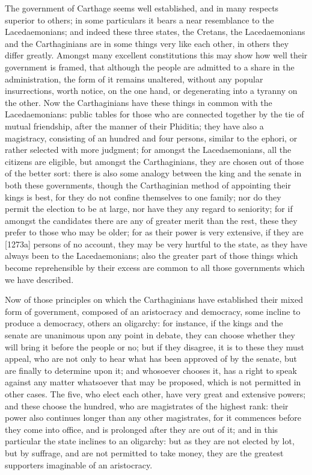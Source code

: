 
The government of Carthage seems well established, and in many respects
superior to others; in some particulars it bears a near resemblance to the
Lacedaemonians; and indeed these three states, the Cretans, the
Lacedaemonians and the Carthaginians are in some things very like each
other, in others they differ greatly. Amongst many excellent constitutions
this may show how well their government is framed, that although the
people are admitted to a share in the administration, the form of it
remains unaltered, without any popular insurrections, worth notice, on the
one hand, or degenerating into a tyranny on the other. Now the
Carthaginians have these things in common with the Lacedaemonians: public
tables for those who are connected together by the tie of mutual
friendship, after the manner of their Phiditia; they have also a
magistracy, consisting of an hundred and four persons, similar to the
ephori, or rather selected with more judgment; for amongst the
Lacedaemonians, all the citizens are eligible, but amongst the
Carthaginians, they are chosen out of those of the better sort: there is
also some analogy between the king and the senate in both these
governments, though the Carthaginian method of appointing their kings is
best, for they do not confine themselves to one family; nor do they permit
the election to be at large, nor have they any regard to seniority; for if
amongst the candidates there are any of greater merit than the rest, these
they prefer to those who may be older; for as their power is very
extensive, if they are [1273a] persons of no account, they may be very
hurtful to the state, as they have always been to the Lacedaemonians; also
the greater part of those things which become reprehensible by their
excess are common to all those governments which we have described.

Now of those principles on which the Carthaginians have established their
mixed form of government, composed of an aristocracy and democracy, some
incline to produce a democracy, others an oligarchy: for instance, if the
kings and the senate are unanimous upon any point in debate, they can
choose whether they will bring it before the people or no; but if they
disagree, it is to these they must appeal, who are not only to hear what
has been approved of by the senate, but are finally to determine upon it;
and whosoever chooses it, has a right to speak against any matter
whatsoever that may be proposed, which is not permitted in other cases.
The five, who elect each other, have very great and extensive powers; and
these choose the hundred, who are magistrates of the highest rank: their
power also continues longer than any other magistrates, for it commences
before they come into office, and is prolonged after they are out of it;
and in this particular the state inclines to an oligarchy: but as they are
not elected by lot, but by suffrage, and are not permitted to take money,
they are the greatest supporters imaginable of an aristocracy.

